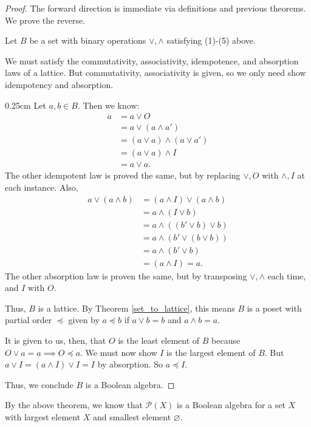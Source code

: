 \documentclass[10pt, letterpaper]{article}
\newcommand{\powerset}[1]{\mathcal{P}(#1)}
\newenvironment{tabOver}[1]
{\begin{adjustwidth}{#1cm}{}}{\end{adjustwidth}}
\theoremstyle{definition}
\begin{document}
\begin{proof}
	The forward direction is immediate via definitions and previous theorems.
	We prove the reverse.

	Let \(B\) be a set with binary operations \(\vee, \wedge\) satisfying
	(1)-(5) above.
	
	We must satisfy the commutativity, associativity, idempotence, and absorption laws
	of a lattice. But commutativity, associativity is given, so we only need show
	idempotency and absorption.
	\begin{tabOver}{0.25}
		Let \(a,b\in B\). Then we know:
		\begin{align*}
			a&=a\vee O \\
			 &=a\vee(a\wedge a') \\
			 &=(a\vee a)\wedge(a\vee a') \\
			 &=(a\vee a)\wedge I \\
			 &=a\vee a.
		\end{align*}
		The other idempotent law is proved the same, but by replacing \(\vee, O\)
		with \(\wedge, I\) at each instance.
		Also,
		\begin{align*}
			a\vee(a\wedge b)&=(a\wedge I)\vee(a\wedge b) \\
							&=a\wedge(I\vee b)\\
							&=a\wedge((b'\vee b)\vee b)\\
							&=a\wedge(b'\vee(b\vee b))\\
							&=a\wedge(b'\vee b)\\
							&=(a\wedge I)=a.
		\end{align*}
		The other absorption law is proven the same, 
		but by transposing \(\vee, \wedge\) each time, and \(I\) with \(O\).
	\end{tabOver}
	Thus, \(B\) is a lattice. By Theorem \ref{set_to_lattice}, this means \(B\) is a poset
	with partial order \(\preceq\) given by \(a\preceq b\) if \(a\vee b=b\) and \(a\wedge b=a\).

	It is given to us, then, that \(O\) is the least element of \(B\) because
	\(O\vee a = a\implies O\preceq a\). 
	We must now show \(I\) is the largest element of \(B\).
	But \(a\vee I=(a\wedge I)\vee I = I\) by absorption. So \(a\preceq I\).

	Thus, we conclude \(B\) is a Boolean algebra.
\end{proof}

By the above theorem, we know that \(\powerset{X}\) is a Boolean algebra 
for a set \(X\) with largest element \(X\) and smallest element \(\varnothing\).
\end{document}
